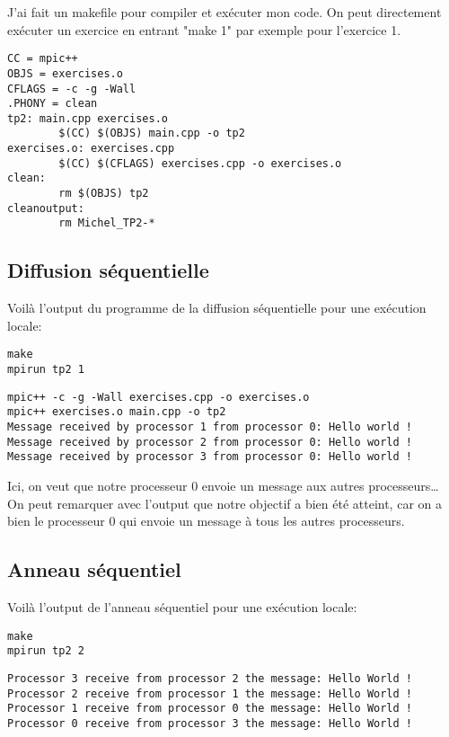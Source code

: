 \documentclass[11pt]{article}
\begin{document}
J'ai fait un makefile pour compiler et exécuter mon code. On peut directement exécuter un exercice en entrant "make 1" par exemple pour l'exercice 1.
\begin{verbatim}
CC = mpic++
OBJS = exercises.o
CFLAGS = -c -g -Wall
.PHONY = clean
tp2: main.cpp exercises.o
        $(CC) $(OBJS) main.cpp -o tp2
exercises.o: exercises.cpp
        $(CC) $(CFLAGS) exercises.cpp -o exercises.o
clean:
        rm $(OBJS) tp2
cleanoutput:
        rm Michel_TP2-*
\end{verbatim}
\subsection{Diffusion séquentielle}
\label{sec:org713b163}
Voilà l'output du programme de la diffusion séquentielle pour une exécution locale:
\begin{verbatim}
make
mpirun tp2 1
\end{verbatim}

\begin{verbatim}
mpic++ -c -g -Wall exercises.cpp -o exercises.o
mpic++ exercises.o main.cpp -o tp2
Message received by processor 1 from processor 0: Hello world !
Message received by processor 2 from processor 0: Hello world !
Message received by processor 3 from processor 0: Hello world !
\end{verbatim}


Ici, on veut que notre processeur 0 envoie un message aux autres processeurs\ldots{} On peut remarquer avec l'output que notre objectif a bien été atteint,
car on a bien le processeur 0 qui envoie un message à tous les autres processeurs.

\subsection{Anneau séquentiel}
\label{sec:org07603d6}

Voilà l'output de l'anneau séquentiel pour une exécution locale:

\begin{verbatim}
make
mpirun tp2 2
\end{verbatim}

\begin{verbatim}
Processor 3 receive from processor 2 the message: Hello World !
Processor 2 receive from processor 1 the message: Hello World !
Processor 1 receive from processor 0 the message: Hello World !
Processor 0 receive from processor 3 the message: Hello World !
\end{verbatim}
\end{document}
